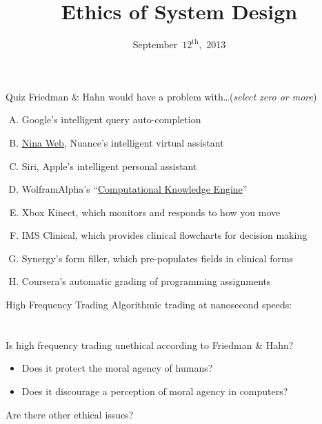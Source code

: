 \documentclass{beamer}
\title{Ethics of System Design}
\date{September~$12^{\text{th}}$,~2013}
\begin{document}
\begin{frame}
\titlepage
\end{frame}

\begin{frame}{Quiz}
Friedman \& Hahn would have a problem with\ldots \hfill (\emph{select zero or more})
\begin{enumerate}[(A)]
\item<1> Google's intelligent query auto-completion
\item<1-2> \href{http://www.nuance.com/landing-pages/products/nina/default.asp}{Nina Web}, Nuance's intelligent virtual assistant
\item<1-2> Siri, Apple's intelligent personal assistant
\item<1-2> WolframAlpha's ``\href{http://www.wolframalpha.com/}{Computational Knowledge Engine}''
\item<1> Xbox Kinect, which monitors and responds to how you move
\item<1-2> IMS Clinical, which provides clinical flowcharts for decision making
\item<1> Synergy's form filler, which pre-populates fields in clinical forms
\item<1> Coursera's automatic grading of programming assignments
\end{enumerate}
\end{frame}

\begin{frame}{High Frequency Trading}
Algorithmic trading at nanosecond speeds: \\
\href{http://www.colbertnation.com/the-colbert-report-videos/421265/november-14-2012/high-frequency-trading}{} \\
\href{http://www.colbertnation.com/the-colbert-report-videos/421266/november-14-2012/high-frequency-trading---christopher-steiner}{} \\
\bigskip
Is high frequency trading unethical according to Friedman \& Hahn?
\begin{itemize}
\item Does it protect the moral agency of humans?
\item Does it discourage a perception of moral agency in computers?
\end{itemize}
Are there other ethical issues?
\end{frame}
\end{document}

